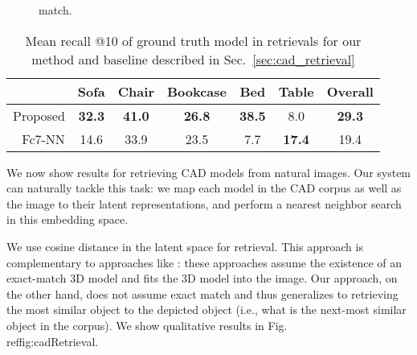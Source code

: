 \documentclass[runningheads]{llncs}
\begin{document}
\begin{figure}
{match.}
\label{fig:class-hists}
\end{figure}\begin{table}[t]
\centering
\caption{Mean recall @10 of ground truth model in retrievals for our method and baseline 
described in Sec.\ \ref{sec:cad_retrieval}}
\label{tab:IKEAImageNN-Quant}
\begin{tabular}{r@{~~~}ccccc@{~~~}c} \toprule
                  & Sofa    & Chair     & Bookcase  & Bed       & Table  & Overall\\ \midrule
Proposed          & \bf 32.3  & \bf 41.0    & \bf 26.8    & \bf 38.5    & 8.0     & \bf 29.3    \\
Fc7-NN            & 14.6      & 33.9        & 23.5        & 7.7        & \bf 17.4   & 19.4   \\ \bottomrule
\end{tabular} 
\end{table}We now show results for retrieving CAD models from natural images. Our system
can naturally tackle this task: we map each model in the CAD corpus as
well as the
image to their latent representations, and perform a nearest neighbor
search in this embedding space.

We use cosine distance in the latent space for retrieval.
This approach is complementary to approaches like
\cite{Lim13,Lim14}: these approaches assume the existence of an exact-match 3D
model and fits the 3D model into the image. Our approach, on the other hand,
does not assume exact match and thus generalizes to retrieving the most similar object to
the depicted object (i.e., what is the next-most similar object in the
corpus). We show qualitative results in Fig.\\ref{fig:cadRetrieval}.
\end{document}
